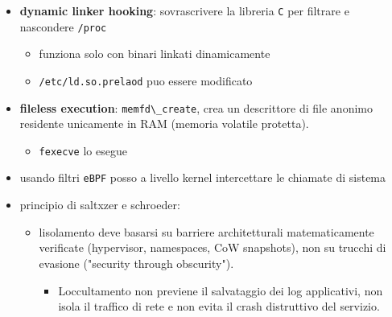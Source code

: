 \begin{itemize}
\tightlist
\item
  \textbf{dynamic linker hooking}: sovrascrivere la libreria
  \passthrough{\lstinline!C!} per filtrare e nascondere
  \passthrough{\lstinline!/proc!}

  \begin{itemize}
  \tightlist
  \item
    funziona solo con binari linkati dinamicamente
  \item
    \passthrough{\lstinline!/etc/ld.so.prelaod!} puo\textquotesingle{}
    essere modificato
  \end{itemize}
\item
  \textbf{fileless execution}: \passthrough{\lstinline!memfd\_create!},
  crea un descrittore di file anonimo residente unicamente in RAM
  (memoria volatile protetta).

  \begin{itemize}
  \tightlist
  \item
    \passthrough{\lstinline!fexecve!} lo esegue
  \end{itemize}
\item
  usando filtri \passthrough{\lstinline!eBPF!} posso a livello kernel
  intercettare le chiamate di sistema
\item
  principio di saltxzer e schroeder:

  \begin{itemize}
  \tightlist
  \item
    l\textquotesingle isolamento deve basarsi su barriere architetturali
    matematicamente verificate (hypervisor, namespaces, CoW snapshots),
    non su trucchi di evasione ("security through obscurity").

    \begin{itemize}
    \tightlist
    \item
      L\textquotesingle occultamento non previene il salvataggio dei log
      applicativi, non isola il traffico di rete e non evita il crash
      distruttivo del servizio.
    \end{itemize}
  \end{itemize}
\end{itemize}
